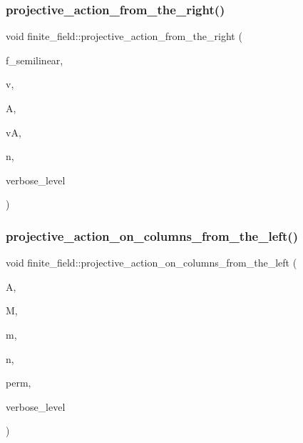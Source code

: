 \subsubsection{\texorpdfstring{projective\+\_\+action\+\_\+from\+\_\+the\+\_\+right()}{projective\_action\_from\_the\_right()}}
{\footnotesize\ttfamily void finite\+\_\+field\+::projective\+\_\+action\+\_\+from\+\_\+the\+\_\+right (\begin{DoxyParamCaption}\item[{\mbox{\hyperlink{galois_8h_a09fddde158a3a20bd2dcadb609de11dc}{I\+NT}}}]{f\+\_\+semilinear,  }\item[{\mbox{\hyperlink{galois_8h_a09fddde158a3a20bd2dcadb609de11dc}{I\+NT}} $\ast$}]{v,  }\item[{\mbox{\hyperlink{galois_8h_a09fddde158a3a20bd2dcadb609de11dc}{I\+NT}} $\ast$}]{A,  }\item[{\mbox{\hyperlink{galois_8h_a09fddde158a3a20bd2dcadb609de11dc}{I\+NT}} $\ast$}]{vA,  }\item[{\mbox{\hyperlink{galois_8h_a09fddde158a3a20bd2dcadb609de11dc}{I\+NT}}}]{n,  }\item[{\mbox{\hyperlink{galois_8h_a09fddde158a3a20bd2dcadb609de11dc}{I\+NT}}}]{verbose\+\_\+level }\end{DoxyParamCaption})}

\mbox{\label{classfinite__field_a06720564d36de251e05e7dd47b8d2cb7}} 
\subsubsection{\texorpdfstring{projective\+\_\+action\+\_\+on\+\_\+columns\+\_\+from\+\_\+the\+\_\+left()}{projective\_action\_on\_columns\_from\_the\_left()}}
{\footnotesize\ttfamily void finite\+\_\+field\+::projective\+\_\+action\+\_\+on\+\_\+columns\+\_\+from\+\_\+the\+\_\+left (\begin{DoxyParamCaption}\item[{\mbox{\hyperlink{galois_8h_a09fddde158a3a20bd2dcadb609de11dc}{I\+NT}} $\ast$}]{A,  }\item[{\mbox{\hyperlink{galois_8h_a09fddde158a3a20bd2dcadb609de11dc}{I\+NT}} $\ast$}]{M,  }\item[{\mbox{\hyperlink{galois_8h_a09fddde158a3a20bd2dcadb609de11dc}{I\+NT}}}]{m,  }\item[{\mbox{\hyperlink{galois_8h_a09fddde158a3a20bd2dcadb609de11dc}{I\+NT}}}]{n,  }\item[{\mbox{\hyperlink{galois_8h_a09fddde158a3a20bd2dcadb609de11dc}{I\+NT}} $\ast$}]{perm,  }\item[{\mbox{\hyperlink{galois_8h_a09fddde158a3a20bd2dcadb609de11dc}{I\+NT}}}]{verbose\+\_\+level }\end{DoxyParamCaption})}

